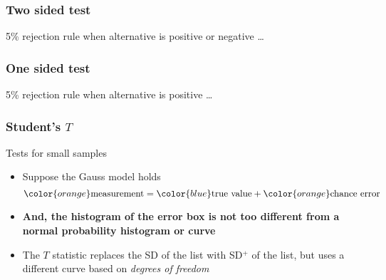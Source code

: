 \documentclass[handout]{beamer}
\begin{document}
   \begin{frame}
   \frametitle{Two sided test}
   \begin{center}
   \end{center}
   {\color{blue} 5\% rejection rule} when alternative is positive or negative \dots
   \end{frame}



   \begin{frame}
   \frametitle{One sided test}
   \begin{center}
   \end{center}
   {\color{blue} 5\% rejection rule} when alternative is positive \dots
   \end{frame}


   \begin{frame} \frametitle{Student's $T$}

   \begin{block}
   {Tests for small samples}
   \begin{itemize}

   \item Suppose the Gauss model holds
     $$
     {\color{orange} \text{measurement}} = {\color{blue} \text{true value}} + {\color{orange} \text{chance error}}
     $$
   \item {\bf And, the histogram of the error box is not too different
   from a normal probability histogram or curve}

    \item The $T$ statistic replaces the SD of the list with SD$^+$ of
   the list, but uses a different curve based on
     {\em degrees of freedom}
   \end{itemize}
   \end{block}
   \end{frame}
\end{document}
